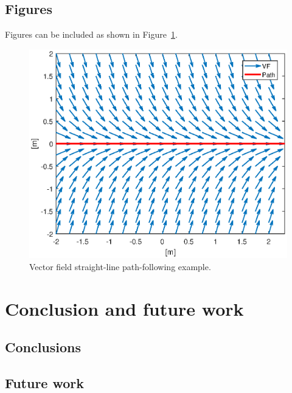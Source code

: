 \documentclass[]{iac_class}
\begin{document}
\subsection{Figures}\label{sec:figures}

Figures can be included as shown in Figure~\ref{fig:VF_straight_line}.

\begin{figure}
\centering
\includegraphics[width = \columnwidth]{images/vf_example.eps}
\caption{Vector field straight-line path-following example.}
\label{fig:VF_straight_line}
\end{figure}







\section{Conclusion and future work}\label{sec:conclusions}
\subsection{Conclusions}\label{ss_sec:first_subsec}
\subsection{Future work}\label{ss_sec:second_subsec}


 

\end{document}
